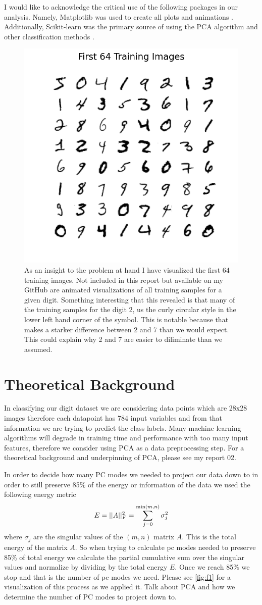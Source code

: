 \documentclass[11pt]{amsart}
\begin{document}
I would like to acknowledge the critical use of the following packages in our analysis.
Namely, Matplotlib was used to create all plots and animations \cite{Hunter:2007}.
Additionally, Scikit-learn was the primary source of using the PCA algorithm and other classification methods \cite{scikit-learn}.

\begin{figure}[h]
	\centering
	\includegraphics[width=.5\textwidth]{../visualizations/first_64_training_images.png}
 	\caption{ As an insight to the problem at hand I have visualized the first 64 training images.
	Not included in this report but available on my GitHub are animated visualizations of all training samples for a given digit. Something interesting that this revealed is that many of the training samples for the digit 2, us the curly circular style in the lower left hand corner of the symbol. This is notable because that makes a starker difference between 2 and 7 than we would expect. This could explain why 2 and 7 are easier to diliminate than we assumed. }\label{fig:f3}
\end{figure}

\section{Theoretical Background}\label{sec:theory}

In classifying our digit dataset we are considering data points which are 28x28 images therefore each datapoint has 784 input variables and from that information we are trying to predict the class labels.
Many machine learning algorithms will degrade in training time and performance with too many input features, therefore we consider using PCA as a data preprocessing step.
For a theoretical background and underpinning of PCA, please see my report 02.

In order to decide how many PC modes we needed to project our data down to in order to still preserve 85\% of the energy or information of the data we used the following energy metric
$$E = ||A||_F^2 = \sum_{j=0}^{ {\rm min}(m,n)} \sigma_j^2$$
where $\sigma_j$ are the singular values of the $(m,n)$ matrix $A$.
This is the total energy of the matrix $A$.
So when trying to calculate pc modes needed to preserve 85\% of total energy we calculate the partial cumulative sum over the singular values and normalize by dividing by the total energy $E$.
Once we reach 85\% we stop and that is the number of pc modes we need. Please see \ref{fig:f1} for a visualization of this process as we applied it.
Talk about PCA and how we determine the number of PC modes to project down to.
\end{document}
